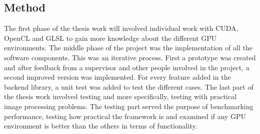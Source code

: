 \subsection{Method}

The first phase of the thesis work will involved individual work with CUDA, OpenCL and GLSL to gain more knowledge about the different GPU environments. The middle phase of the project was the implementation of all the software components. This was an iterative process. First a prototype was created and after feedback from a supervisor and other people involved in the project, a second improved version was implemented. For every feature added in the backend library, a unit test was added to test the different cases. The last part of the thesis work involved testing and more specifically, testing with practical image processing problems. The testing part served the purpose of benchmarking performance, testing how practical the framework is and examined if any GPU environment is better than the others in terms of functionality.
